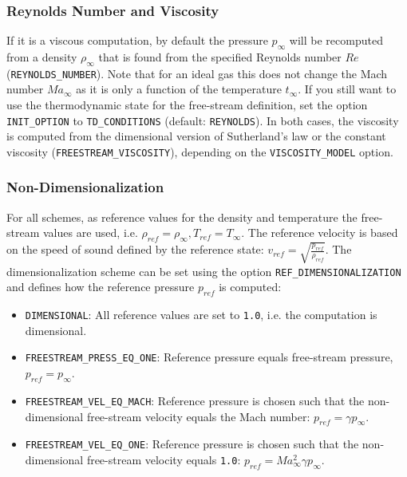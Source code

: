 \documentclass{article}
\begin{document}
\subsubsection{Reynolds Number and Viscosity}

If it is a viscous computation, by default the pressure \(p_\infty\) will be recomputed from a density \(\rho_\infty\) that is found from the specified Reynolds number \(Re\) (\verb|REYNOLDS_NUMBER|). Note that for an ideal gas this does not change the Mach number \(Ma_\infty\) as it is only a function of the temperature \(t_\infty\). If you still want to use the thermodynamic state for the free-stream definition, set the option \verb|INIT_OPTION| to \verb|TD_CONDITIONS| (default: \verb|REYNOLDS|). In both cases, the viscosity is computed from the dimensional version of Sutherland’s law or the constant viscosity (\verb|FREESTREAM_VISCOSITY|), depending on the \verb|VISCOSITY_MODEL| option.


\subsubsection{Non-Dimensionalization}

For all schemes, as reference values for the density and temperature the free-stream values are used, i.e. \(\rho_{ref} = \rho_\infty, T_{ref} = T_\infty\). The reference velocity is based on the speed of sound defined by the reference state: \(v_{ref} = \sqrt{\frac{p_{ref}}{\rho_{ref}}}\). The dimensionalization scheme can be set using the option \verb|REF_DIMENSIONALIZATION| and defines how the reference pressure \(p_{ref}\) is computed:

\begin{itemize}
    \item \verb|DIMENSIONAL|: All reference values are set to \verb|1.0|, i.e. the computation is dimensional.
    \item \verb|FREESTREAM_PRESS_EQ_ONE|: Reference pressure equals free-stream pressure, \(p_{ref} = p_\infty\).
    \item \verb|FREESTREAM_VEL_EQ_MACH|: Reference pressure is chosen such that the non-dimensional free-stream velocity equals the Mach number: \(p_{ref} = \gamma p_\infty\).
    \item \verb|FREESTREAM_VEL_EQ_ONE|: Reference pressure is chosen such that the non-dimensional free-stream velocity equals \verb|1.0|: \(p_{ref} = Ma_\infty^2\gamma p_\infty\).
\end{itemize}
\end{document}
